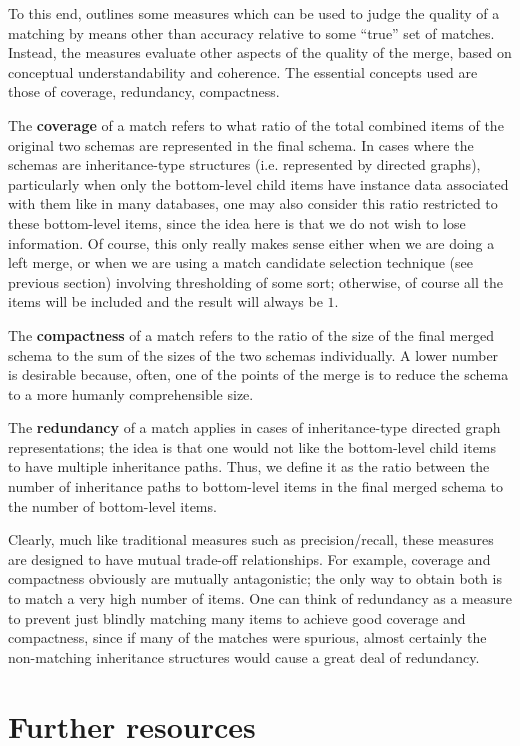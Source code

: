 \documentclass{article}
\theoremstyle{definition}
\theoremstyle{remark}
\begin{document}
To this end, \cite{comabenchmark} outlines some measures which can be used to judge the quality of a matching by means other than accuracy relative to some ``true'' set of matches. Instead, the measures evaluate other aspects of the quality of the merge, based on conceptual understandability and coherence. The essential concepts used are those of coverage, redundancy, compactness.

The \textbf{coverage} of a match refers to what ratio of the total combined items of the original two schemas are represented in the final schema. In cases where the schemas are inheritance-type structures (i.e. represented by directed graphs), particularly when only the bottom-level child items have instance data associated with them like in many databases, one may also consider this ratio restricted to these bottom-level items, since the idea here is that we do not wish to lose information. Of course, this only really makes sense either when we are doing a left merge, or when we are using a match candidate selection technique (see previous section) involving thresholding of some sort; otherwise, of course all the items will be included and the result will always be $1$.

The \textbf{compactness} of a match refers to the ratio of the size of the final merged schema to the sum of the sizes of the two schemas individually. A lower number is desirable because, often, one of the points of the merge is to reduce the schema to a more humanly comprehensible size.

The \textbf{redundancy} of a match applies in cases of inheritance-type directed graph representations; the idea is that one would not like the bottom-level child items to have multiple inheritance paths. Thus, we define it as the ratio between the number of inheritance paths to bottom-level items in the final merged schema to the number of bottom-level items.

Clearly, much like traditional measures such as precision/recall, these measures are designed to have mutual trade-off relationships. For example, coverage and compactness obviously are mutually antagonistic; the only way to obtain both is to match a very high number of items. One can think of redundancy as a measure to prevent just blindly matching many items to achieve good coverage and compactness, since if many of the matches were spurious, almost certainly the non-matching inheritance structures would cause a great deal of redundancy.

\section{Further resources}
\end{document}
